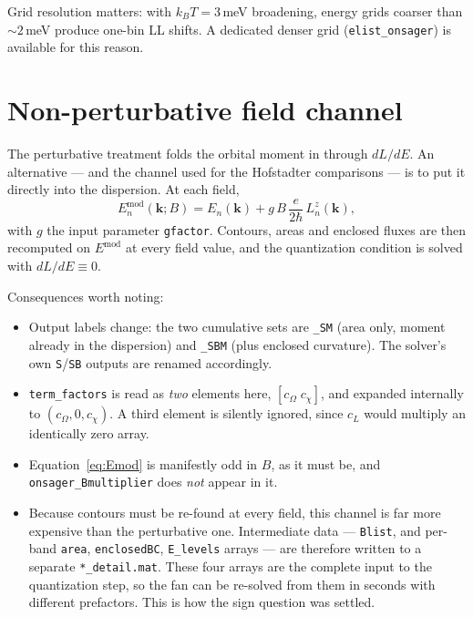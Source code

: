 \documentclass[11pt]{article}
\newcommand{\kb}{\mathbf{k}}
\newcommand{\Om}{\Omega}
\newcommand{\Bfield}{B}
\newcommand{\code}[1]{\texttt{#1}}
\begin{document}
Grid resolution matters: with $k_BT = 3\,$meV broadening, energy grids
coarser than ${\sim}2\,$meV produce one-bin LL shifts.  A dedicated
denser grid (\code{elist\_onsager}) is available for this reason.

\section{Non-perturbative field channel}\label{sec:bfield}

The perturbative treatment folds the orbital moment in through
$dL/dE$.  An alternative --- and the channel used for the Hofstadter
comparisons --- is to put it directly into the dispersion.  At each
field,
\begin{equation}\label{eq:Emod}
  E^{\text{mod}}_n(\kb;\Bfield)
  = E_n(\kb) + g\,\Bfield\,\frac{e}{2\hbar}\,L_n^z(\kb),
\end{equation}
with $g$ the input parameter \code{gfactor}.  Contours, areas and
enclosed fluxes are then recomputed on $E^{\text{mod}}$ at every field
value, and the quantization condition is solved with $dL/dE \equiv 0$.

Consequences worth noting:
\begin{itemize}
\item Output labels change: the two cumulative sets are \code{\_SM}
  (area only, moment already in the dispersion) and \code{\_SBM} (plus
  enclosed curvature).  The solver's own \code{S}/\code{SB} outputs are
  renamed accordingly.
\item \code{term\_factors} is read as \emph{two} elements here,
  $[c_\Om\; c_\chi]$, and expanded internally to $(c_\Om, 0, c_\chi)$.
  A third element is silently ignored, since $c_L$ would multiply an
  identically zero array.
\item Equation~\eqref{eq:Emod} is manifestly odd in $\Bfield$, as it
  must be, and \code{onsager\_Bmultiplier} does \emph{not} appear in it.
\item Because contours must be re-found at every field, this channel is
  far more expensive than the perturbative one.  Intermediate data ---
  \code{Blist}, and per-band \code{area}, \code{enclosedBC},
  \code{E\_levels} arrays --- are therefore written to a separate
  \code{*\_detail.mat}.  These four arrays are the complete input to the
  quantization step, so the fan can be re-solved from them in seconds
  with different prefactors.  This is how the sign question was settled.
\end{itemize}
\end{document}
